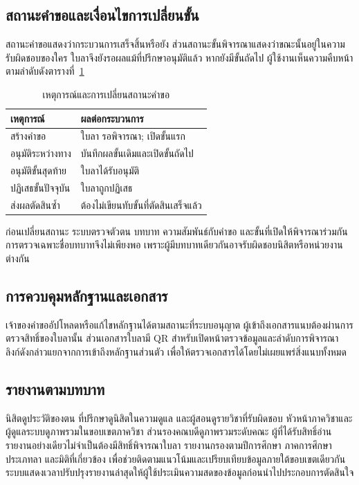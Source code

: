 \subsection{สถานะคำขอและเงื่อนไขการเปลี่ยนขั้น}
สถานะคำขอแสดงว่ากระบวนการเสร็จสิ้นหรือยัง ส่วนสถานะขั้นพิจารณาแสดงว่าขณะนั้นอยู่ในความรับผิดชอบของใคร ใบลาจึงยังรอผลแม้ที่ปรึกษาอนุมัติแล้ว หากยังมีขั้นถัดไป ผู้ใช้งานเห็นความคืบหน้าตามลำดับดังตารางที่~\ref{tab:state-transition}
\begin{table}[H]
\caption{เหตุการณ์และการเปลี่ยนสถานะคำขอ}\label{tab:state-transition}
\centering
\begin{tabularx}{\columnwidth}{|p{25mm}|X|}
\hline
เหตุการณ์ & ผลต่อกระบวนการ \\ \hline
สร้างคำขอ & ใบลา รอพิจารณา; เปิดขั้นแรก \\ \hline
อนุมัติระหว่างทาง & บันทึกผลขั้นเดิมและเปิดขั้นถัดไป \\ \hline
อนุมัติขั้นสุดท้าย & ใบลาได้รับอนุมัติ \\ \hline
ปฏิเสธขั้นปัจจุบัน & ใบลาถูกปฏิเสธ \\ \hline
ส่งผลตัดสินซ้ำ & ต้องไม่เขียนทับขั้นที่ตัดสินเสร็จแล้ว \\ \hline
\end{tabularx}
\end{table}
ก่อนเปลี่ยนสถานะ ระบบตรวจตัวตน บทบาท ความสัมพันธ์กับคำขอ และขั้นที่เปิดให้พิจารณาร่วมกัน การตรวจเฉพาะชื่อบทบาทจึงไม่เพียงพอ เพราะผู้มีบทบาทเดียวกันอาจรับผิดชอบนิสิตหรือหน่วยงานต่างกัน
\subsection{การควบคุมหลักฐานและเอกสาร}
เจ้าของคำขออัปโหลดหรือแก้ไขหลักฐานได้ตามสถานะที่ระบบอนุญาต ผู้เข้าถึงเอกสารแนบต้องผ่านการตรวจสิทธิ์ของใบลานั้น ส่วนเอกสารใบลามี QR สำหรับเปิดหน้าตรวจข้อมูลและลำดับการพิจารณา ลิงก์ดังกล่าวแยกจากการเข้าถึงหลักฐานส่วนตัว เพื่อให้ตรวจเอกสารได้โดยไม่เผยแพร่สิ่งแนบทั้งหมด
\subsection{รายงานตามบทบาท}
นิสิตดูประวัติของตน ที่ปรึกษาดูนิสิตในความดูแล และผู้สอนดูรายวิชาที่รับผิดชอบ หัวหน้าภาควิชาและผู้ดูแลระบบดูภาพรวมในขอบเขตภาควิชา ส่วนรองคณบดีดูภาพรวมระดับคณะ ผู้ที่ได้รับสิทธิ์อ่านรายงานอย่างเดียวไม่จำเป็นต้องมีสิทธิ์พิจารณาใบลา
รายงานกรองตามปีการศึกษา ภาคการศึกษา ประเภทลา และมิติที่เกี่ยวข้อง เพื่อช่วยติดตามแนวโน้มและเปรียบเทียบข้อมูลภายใต้ขอบเขตเดียวกัน ระบบแสดงเวลาปรับปรุงรายงานล่าสุดให้ผู้ใช้ประเมินความสดของข้อมูลก่อนนำไปประกอบการตัดสินใจ
